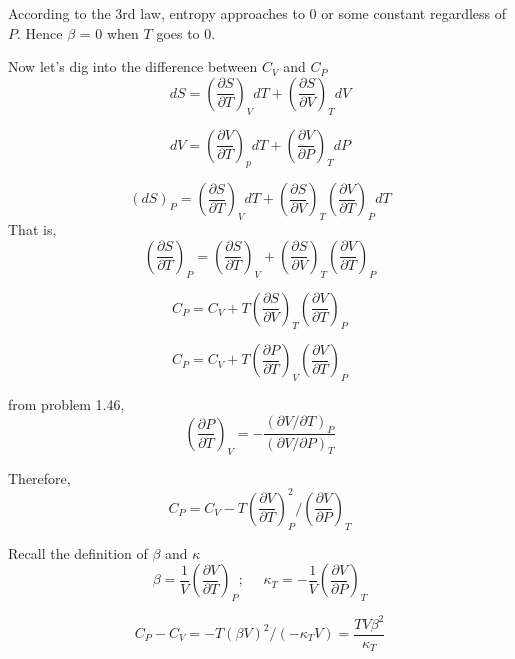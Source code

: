According to the 3rd law, entropy approaches to 0 or some constant regardless of $P$. Hence $\beta$ = 0 when $T$ goes to 0.

Now let's dig into the difference between $C_V$ and $C_P$
\begin{equation}
dS = (\frac{\partial{S}}{\partial{T}})_V dT + (\frac{\partial{S}}{\partial{V}})_T dV
\end{equation}

\begin{equation}
dV = (\frac{\partial{V}}{\partial{T}})_p dT + (\frac{\partial{V}}{\partial{P}})_T dP
\end{equation}

\begin{equation}
(dS)_P = (\frac{\partial{S}}{\partial{T}})_V dT + (\frac{\partial{S}}{\partial{V}})_T (\frac{\partial{V}}{\partial T})_P dT
\end{equation}
That is,
\begin{equation}
(\frac{\partial S}{\partial T})_P = (\frac{\partial{S}}{\partial{T}})_V + (\frac{\partial{S}}{\partial{V}})_T (\frac{\partial{V}}{\partial T})_P
\end{equation}

\begin{equation}
C_P = C_V + T(\frac{\partial{S}}{\partial{V}})_T (\frac{\partial{V}}{\partial T})_P
\end{equation}

\begin{equation}
C_P = C_V + T(\frac{\partial{P}}{\partial{T}})_V (\frac{\partial{V}}{\partial T})_P
\end{equation}

from problem 1.46,
\begin{equation}
(\frac{\partial{P}}{\partial{T}})_V = -\frac{(\partial{V}/{\partial T})_P}{(\partial{V}/{\partial P})_T}
\end{equation}

Therefore,
\begin{equation}
C_P = C_V - T(\frac{\partial{V}}{\partial{T}})^2_P / (\frac{\partial{V}}{\partial P})_T
\end{equation}

Recall the definition of $\beta$ and $\kappa$
\begin{equation}
\beta = \frac{1}{V}(\frac{\partial{V}}{\partial{T}})_P;~~~~~~ \kappa_T = -\frac{1}{V}(\frac{\partial{V}}{\partial{P}})_T
\end{equation}

\begin{equation}
C_P - C_V = -T(\beta V)^2/(-\kappa_T V) = \frac{TV\beta^2}{\kappa_T}
\end{equation}



